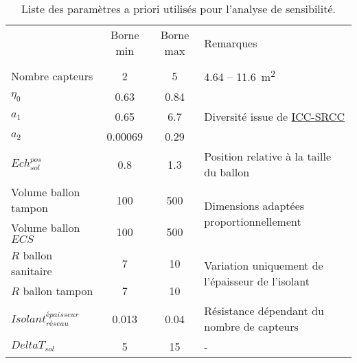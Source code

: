 \begin{table}
\centering
\caption{Liste des paramètres a priori utilisés pour l’analyse de sensibilité.}
\label{tab:facteur_sensibilite}
\begin{tabular}{l c c l}
  \toprule
  \addlinespace
                                               & Borne min     & Borne max   & Remarques                                                            \\
  \addlinespace
  \multicolumn{4}{l}{\bm{$SSC$}}                                                                           \\
  \midrule
  Nombre capteurs                              & \num{2}       & \num{5}     & \num{4.64} -- \SI{11.6}{\metre\squared}                              \\
  $\eta_{0}$                                   & \num{0.63}    & \num{0.84}  & \multirow{3}{*}{Diversité issue de \href{www.solar-rating.org}{ICC-SRCC}}   \\
  $a_{1}$                                      & \num{0.65}    & \num{6.7}   &                                                                      \\
  $a_{2}$                                      & \num{0.00069} & \num{0.29}  &                                                                      \\
  $Ech_{sol}^{pos}$                            & \num{0.8}     & \num{1.3}   & Position relative à la taille du ballon                              \\
  Volume ballon tampon                         & \num{100}     & \num{500}   & \multirow{2}{*}{Dimensions adaptées proportionnellement}             \\
  Volume ballon $ECS$                          & \num{100}     & \num{500}   &                                                                      \\
  $R$ ballon sanitaire                         & \num{7}       & \num{10}    & \multirow{2}{*}{Variation uniquement de l’épaisseur de l’isolant}    \\
  $R$ ballon tampon                            & \num{7}       & \num{10}    &                                                                      \\
  $Isolant_{réseau}^{épaisseur}$               & \num{0.013}   & \num{0.04}  & Résistance dépendant du nombre de capteurs                           \\
  $DeltaT_{sol}$                               & \num{5}       & \num{15}    &  -                                                                   \\

\end{tabular}
\end{table}
